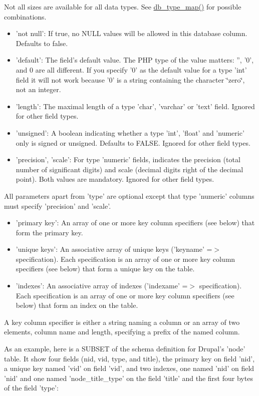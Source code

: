 Not all sizes are available for all data types. See \hyperlink{group__schemaapi_gadf0495656599ba9336d68675b54f8dd}{db\_\-type\_\-map()} for possible combinations.\begin{itemize}
\item 'not null': If true, no NULL values will be allowed in this database column. Defaults to false.\item 'default': The field's default value. The PHP type of the value matters: '', '0', and 0 are all different. If you specify '0' as the default value for a type 'int' field it will not work because '0' is a string containing the character \char`\"{}zero\char`\"{}, not an integer.\item 'length': The maximal length of a type 'char', 'varchar' or 'text' field. Ignored for other field types.\item 'unsigned': A boolean indicating whether a type 'int', 'float' and 'numeric' only is signed or unsigned. Defaults to FALSE. Ignored for other field types.\item 'precision', 'scale': For type 'numeric' fields, indicates the precision (total number of significant digits) and scale (decimal digits right of the decimal point). Both values are mandatory. Ignored for other field types.\end{itemize}


All parameters apart from 'type' are optional except that type 'numeric' columns must specify 'precision' and 'scale'.

\begin{itemize}
\item 'primary key': An array of one or more key column specifiers (see below) that form the primary key.\item 'unique keys': An associative array of unique keys ('keyname' =$>$ specification). Each specification is an array of one or more key column specifiers (see below) that form a unique key on the table.\item 'indexes': An associative array of indexes ('indexame' =$>$ specification). Each specification is an array of one or more key column specifiers (see below) that form an index on the table.\end{itemize}


A key column specifier is either a string naming a column or an array of two elements, column name and length, specifying a prefix of the named column.

As an example, here is a SUBSET of the schema definition for Drupal's 'node' table. It show four fields (nid, vid, type, and title), the primary key on field 'nid', a unique key named 'vid' on field 'vid', and two indexes, one named 'nid' on field 'nid' and one named 'node\_\-title\_\-type' on the field 'title' and the first four bytes of the field 'type':



